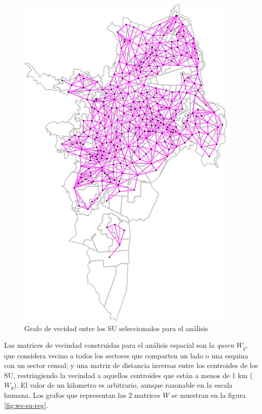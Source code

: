 \documentclass[12pt,]{book}
\begin{document}
\begin{figure}
\includegraphics[width=1\linewidth]{tesis-unigis_files/figure-latex/w-su-reg-1} \caption{Grafo de vecidad entre los SU seleccionados para el análisis}\label{fig:w-su-reg}
\end{figure}

Las matrices de vecindad construidas para el análisis espacial son la
\emph{queen} \(W_q\), que considera vecino a todos los sectores que
comparten un lado o una esquina con un sector censal; y una matriz de
distancia inversas entre los centroides de los SU, restringiendo la
vecindad a aquellos centroides que están a menos de 1 km (\(W_d\)). El
valor de un kilometro es arbitrario, aunque razonable en la escala
humana. Los grafos que representan las 2 matrices \(W\) se muestran en
la figura \ref{fig:ws-su-reg}.
\end{document}
